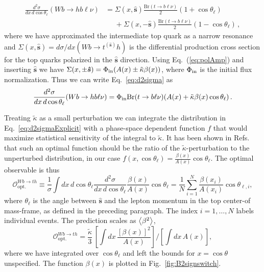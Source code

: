 \documentclass[11pt,a4paper]{article}
\newcommand{\Br}[0]{\mathrm{Br}}
\newcommand{\mc}[1]{\mathcal{#1}}
\newcommand{\hvec}[1]{\bm{\hat #1}}
\begin{document}
\begin{equation}
\label{eq:d2sigma}
\begin{split}
\frac{d^2\sigma}{dx\,d\cos \theta_\ell}(Wb \to h b \ell \nu) &=  \Sigma(x,\hvec{s}) \frac{\Br(t\to b \ell \nu)}{2}(1+\cos\theta_\ell) \\
&\phantom{=}+\Sigma(x,-\hvec{s})\frac{\Br(t\to b \ell \nu)}{2}(1-\cos\theta_\ell)\,,
\end{split}
\end{equation}
where we have approximated the intermediate top quark as a narrow resonance and $\Sigma(x,\hvec{s}) = d\sigma/dx(Wb \to t^{(\hvec{s})}h)$ is the differential production cross section for the top quarks polarized in the $\hvec{s}$ direction. Using Eq.~(\ref{eq:polAmp}) and inserting $\hvec{s}$ we have $\Sigma(x,\pm\hvec{s}) = \Phi_{\rm in}( A(x)\pm \tilde{\kappa} \beta(x))$, where $\Phi_{\rm in}$ is the initial flux normalization. Thus we can write Eq.~\eqref{eq:d2sigma} as
\begin{equation}
\label{eq:d2sigmaExplicit}
\frac{d^2\sigma}{dx\,d\cos \theta_\ell}(Wb \to h b \ell \nu) = \Phi_{\rm in} \Br(t\to b \ell \nu) (A(x)+\tilde{\kappa} \beta(x)\cos\theta_\ell)\,.
\end{equation}


Treating $\tilde \kappa$ as a small perturbation we can integrate the distribution in Eq.~\eqref{eq:d2sigmaExplicit} with a phase-space dependent function $f$ that would maximize statistical sensitivity of the integral to $\tilde \kappa$. It has been shown in Refs.~\cite{Atwood:1991ka,hep-ph/9605326} that such an optimal function should be the ratio of the $\tilde \kappa$-perturbation to the unperturbed distribution, in our case $f(x,\cos\theta_\ell) = \frac{\beta(x)}{A(x)} \cos\theta_\ell$. The optimal observable is thus
\begin{equation}
\label{eq:OptParton}
\mc{O}^{Wb \to th}_\mathrm{opt.} \equiv \frac{1}{\sigma}\int dx\,d\cos\theta_\ell   \frac{d^2\sigma}{dx\,d\cos \theta_\ell} \frac{\beta(x)}{A(x)} \cos\theta_\ell = \frac{1}{N}\sum_{i=1}^N\frac{\beta(x_i)}{A(x_i)} \cos\theta_{\ell,i},
\end{equation}
where $\theta_\ell$ is the angle between $\hvec{s}$ and the lepton momentum in the top center-of mass-frame, as defined in the preceding paragraph. The index $i=1,\ldots,N$ labels individual events. The prediction scales as $\Braket{\beta^2}$,
\begin{equation}
\label{eq:OptPartonExplicit}
\mc{O}^{Wb \to th}_\mathrm{opt.} = \frac{\tilde \kappa}{3}\, \left[\int dx\, \frac{[\beta(x)]^2}{A(x)}\right]\Big/\left[\int dx \,A(x) \right],
\end{equation}
where we have integrated over $\cos \theta_\ell$ and left the bounds for $x = \cos \theta$ unspecified. The function $\beta(x)$ is plotted in Fig.~\ref{fig:B2signswitch}.
\end{document}
